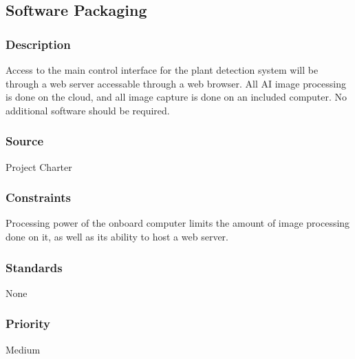 \subsection{Software Packaging}
\subsubsection{Description}
Access to the main control interface for the plant detection system will be through a web server accessable through a web browser.
All AI image processing is done on the cloud, and all image capture is done on an included computer. No additional software should be required.
\subsubsection{Source}
Project Charter
\subsubsection{Constraints}
Processing power of the onboard computer limits the amount of image processing done on it, as well as its ability to host a web server.
\subsubsection{Standards}
None
\subsubsection{Priority}
Medium